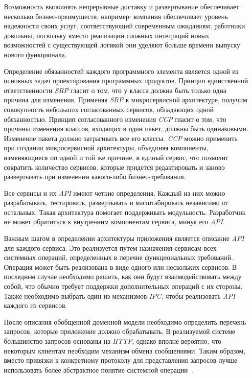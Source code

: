 Возможность выполнять непрерывные доставку и развертывание обеспечивает несколько бизнес-преимуществ, например: компания обеспечивает уровень надежности своих услуг, соответствующий современным ожиданиям; работники довольны, поскольку вместо реализации сложных интеграций новых возможностей с существующей логикой они уделяют больше времени выпуску нового функционала.

Определение обязанностей каждого программного элемента является одной из основных задач проектирования программных продуктов. Принцип единственной ответственности \textit{SRP} гласит о том, что у класса должна быть только одна причина для изменения. Применяя \textit{SRP} к микросервисной архитектуре, получим совокупность небольших согласованных сервисов, обладающих одной обязанностью. Принцип согласованного изменения \textit{CCP} гласит о том, что причины изменения классов, входящих в один пакет, должны быть одинаковыми. Изменение пакета должно затрагивать все его классы. \textit{CCP} можно применить при создании микросервисной архитектуры, объединяя компоненты, изменяющиеся по одной и той же причине, в единый сервис, что позволит сократить количество сервисов, которые придется редактировать и заново развертывать при изменении какого-либо бизнес-требования.

Все сервисы и их \textit{API} имеют четкие определения. Каждый из них можно разрабатывать, тестировать, развертывать и масштабировать независимо от остальных. Такая архитектура помогает поддерживать модульность. Разработчик не может обратиться к внутренним компонентам сервиса, минуя его \textit{API}.

Важным шагом в определении архитектуры приложения является описание \textit{API} для каждого сервиса. Это реализуется путем назначения сервисам всех системных операций, определенных в перечне функциональных требований. Операция может быть реализована в виде одного или нескольких сервисов. В последнем случае необходимо решить, как они будут взаимодействовать между собой, что обычно требует поддержки дополнительных операций с их стороны. Также необходимо выбрать один из механизмов \textit{IPC}, чтобы реализовать \textit{API} каждого из сервисов.

После описания обобщенной доменной модели необходимо определить перечень запросов, которые приложение должно обрабатывать. В реализуемой системе большинство запросов основаны на \textit{HTTP}, однако вполне вероятно, что некоторым клиентам необходим механизм обмена сообщениями. Таким образом, вместо привязки к конкретному протоколу для представления запросов лучше использовать более абстрактное понятие системной операции~\cite{book_microservices_patterns}.

